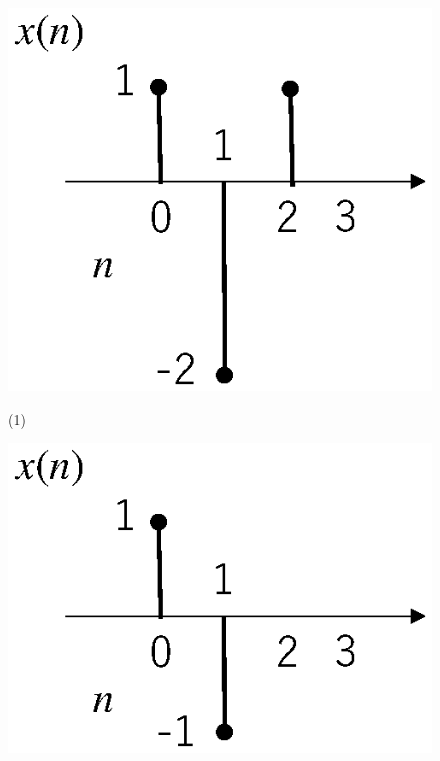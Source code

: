\begin{figure}[H]
\begin{center}

\begin{minipage}[b]{.3\textwidth}
\begin{center}
\includegraphics[width=.98\textwidth]{fig/zu-3e-2b.eps}

(1)
\end{center}
\end{minipage}
\begin{minipage}[b]{.3\textwidth}
\begin{center}
\includegraphics[width=.98\textwidth]{fig/zu-3e-2a.eps}


\end{center}
\end{minipage}
\end{center}
\end{figure}
